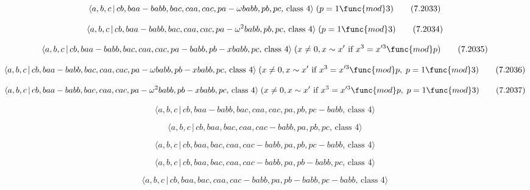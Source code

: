\documentclass[10pt]{article}
\begin{document}
\begin{equation}
\langle a,b,c\,|\,cb,baa-babb,bac,caa,cac,pa-\omega babb,pb,pc,\,\text{class 
}4\rangle \;(p=1\func{mod}3)  \tag{7.2033}
\end{equation}

\begin{equation}
\langle a,b,c\,|\,cb,baa-babb,bac,caa,cac,pa-\omega ^{2}babb,pb,pc,\,\text{%
class }4\rangle \;(p=1\func{mod}3)  \tag{7.2034}
\end{equation}

\begin{equation}
\langle a,b,c\,|\,cb,baa-babb,bac,caa,cac,pa-babb,pb-xbabb,pc,\,\text{class }%
4\rangle \;(x \neq 0, x \sim x^{\prime }\text{ if }x^3=x^{\prime 3 }\func{mod%
} p)  \tag{7.2035}
\end{equation}

\begin{equation}
\langle a,b,c\,|\,cb,baa-babb,bac,caa,cac,pa-\omega babb,pb-xbabb,pc,\,\text{%
class }4\rangle \;(x\neq 0,x \sim x^{\prime }\text{ if }x^3=x^{\prime 3}%
\func{mod}p,\;p=1\func{mod}3)  \tag{7.2036}
\end{equation}

\begin{equation}
\langle a,b,c\,|\,cb,baa-babb,bac,caa,cac,pa-\omega ^{2}babb,pb-xbabb,pc,\,%
\text{class }4\rangle \;(x\neq 0,x \sim x^{\prime }\text{ if }x^3=x^{\prime
3}\func{mod}p,\;p=1\func{mod}3)  \tag{7.2037}
\end{equation}

\begin{equation}
\langle a,b,c\,|\,cb,baa-babb,bac,caa,cac,pa,pb,pc-babb,\,\text{class }%
4\rangle  \tag{7.2038}
\end{equation}

\begin{equation}
\langle a,b,c\,|\,cb,baa,bac,caa,cac-babb,pa,pb,pc,\,\text{class }4\rangle 
\tag{7.2039}
\end{equation}

\begin{equation}
\langle a,b,c\,|\,cb,baa,bac,caa,cac-babb,pa,pb,pc-babb,\,\text{class }%
4\rangle  \tag{7.2040}
\end{equation}

\begin{equation}
\langle a,b,c\,|\,cb,baa,bac,caa,cac-babb,pa,pb-babb,pc,\,\text{class }%
4\rangle  \tag{7.2041}
\end{equation}

\begin{equation}
\langle a,b,c\,|\,cb,baa,bac,caa,cac-babb,pa,pb-babb,pc-babb,\,\text{class }%
4\rangle  \tag{7.2042}
\end{equation}
\end{document}
